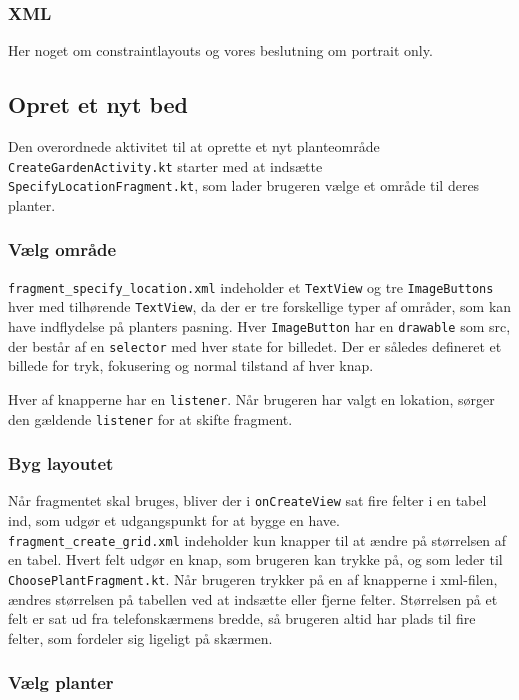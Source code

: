 \subsubsection{XML}
Her noget om constraintlayouts og vores beslutning om portrait only.

\subsection{Opret et nyt bed}
Den overordnede aktivitet til at oprette et nyt planteområde \texttt{CreateGardenActivity.kt} starter med at indsætte \texttt{SpecifyLocationFragment.kt}, som lader brugeren vælge et område til deres planter.

\subsubsection{Vælg område}
\texttt{fragment\_specify\_location.xml} indeholder et \texttt{TextView} og tre \texttt{ImageButtons} hver med tilhørende \texttt{TextView}, da der er tre forskellige typer af områder, som kan have indflydelse på planters pasning. Hver \texttt{ImageButton} har en \texttt{drawable} som src, der består af en \texttt{selector} med hver state for billedet. Der er således defineret et billede for tryk, fokusering og normal tilstand af hver knap.

Hver af knapperne har en \texttt{listener}. Når brugeren har valgt en lokation, sørger den gældende \texttt{listener} for at skifte fragment.

\subsubsection{Byg layoutet}
Når fragmentet skal bruges, bliver der i \texttt{onCreateView} sat fire felter i en tabel ind, som udgør et udgangspunkt for at bygge en have. \texttt{fragment\_create\_grid.xml} indeholder kun knapper til at ændre på størrelsen af en tabel. Hvert felt udgør en knap, som brugeren kan trykke på, og som leder til \texttt{ChoosePlantFragment.kt}. Når brugeren trykker på en af knapperne i xml-filen, ændres størrelsen på tabellen ved at indsætte eller fjerne felter. Størrelsen på et felt er sat ud fra telefonskærmens bredde, så brugeren altid har plads til fire felter, som fordeler sig ligeligt på skærmen. 

\subsubsection{Vælg planter}

